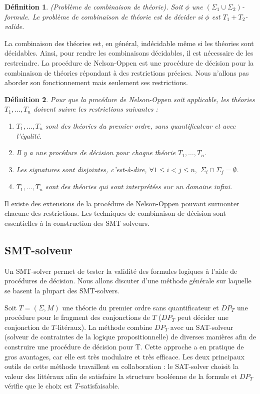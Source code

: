 \documentclass[11pt,openany]{article}
\newtheorem{definition}{D\'efinition}[subsection]
\begin{document}
	\begin{definition}
	(Probl\`eme de combinaison de th\'eorie). Soit $\phi$ une $(\Sigma_{1}\cup\Sigma_{2})$-formule. Le probl\`eme de combinaison de th\'eorie est de d\'ecider si $\phi$ est $T_{1}+T_{2}$-valide.
	\end{definition}
	
	La combinaison des th\'eories est, en g\'en\'eral, ind\'ecidable m\^eme si les th\'eories sont d\'ecidables. Ainsi, pour rendre les combinaisons d\'ecidables, il est n\'ecessaire de les restreindre.	La proc\'edure de Nelson-Oppen est une proc\'edure de d\'ecision pour la combinaison de th\'eories r\'epondant \`a des restrictions pr\'ecises. Nous n'allons pas aborder son fonctionnement mais seulement ses restrictions.
	\begin{definition}
		Pour que la proc\'edure de Nelson-Oppen soit applicable, les th\'eories $T_{1},\ldots,T_{n}$ doivent suivre les restrictions suivantes :
		\begin{enumerate}
		\item $T_{1},\ldots,T_{n}$ sont des th\'eories du premier ordre, sans quantificateur et avec l'\'egalit\'e.
		\item Il y a une proc\'edure de d\'ecision pour chaque th\'eorie $T_{1},\ldots,T_{n}$.
		\item Les signatures sont disjointes, c'est-\`a-dire, $\forall 1\leq i<j\leq n,$ $\Sigma_{i}\cap\Sigma_{j}=\emptyset$.
		\item $T_{1},\ldots,T_{n}$ sont des th\'eories qui sont interpr\'et\'ees sur un domaine infini.
		\end{enumerate}
	\end{definition}
	Il existe des extensions de la proc\'edure de Nelson-Oppen pouvant surmonter chacune des restrictions. Les techniques de combinaison de d\'ecision sont essentielles \`a la construction des SMT solveurs.

 	\subsection{SMT-solveur}
	 		Un SMT-solver permet de tester la validit\'e des formules logiques \`a l'aide de proc\'edures de d\'ecision. Nous allons discuter d'une m\'ethode g\'en\'erale sur laquelle se basent la plupart des SMT-solvers.
	 		
	 		 Soit $T=(\Sigma,M)$ une th\'eorie du premier ordre sans quantificateur et $DP_{T}$ une proc\'edure pour le fragment des conjonctions de $T$ ($DP_{T}$ peut d\'ecider une conjonction de $T$-lit\'eraux). La m\'ethode combine $DP_{T}$ avec un SAT-solveur (solveur de contraintes de la logique propositionnelle) de diverses mani\`eres afin de construire une proc\'edure de d\'ecision pour T. Cette approche a en pratique de gros avantages, car elle est tr\`es modulaire et tr\`es efficace. Les deux principaux outils de cette m\'ethode travaillent en collaboration : le SAT-solver choisit la valeur des litt\'eraux afin de satisfaire la structure bool\'eenne de la formule et $DP_{T}$ v\'erifie que le choix est $T$-satisfaisable.
	 		 
\end{document}
